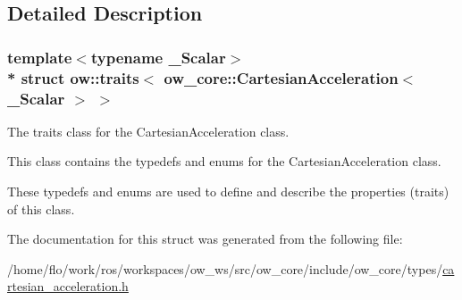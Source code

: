\subsection{Detailed Description}
\subsubsection*{template$<$typename \+\_\+\+Scalar$>$\\*
struct ow\+::traits$<$ ow\+\_\+core\+::\+Cartesian\+Acceleration$<$ \+\_\+\+Scalar $>$ $>$}

The traits class for the Cartesian\+Acceleration class. 

This class contains the typedefs and enums for the Cartesian\+Acceleration class.

These typedefs and enums are used to define and describe the properties (traits) of this class. 

The documentation for this struct was generated from the following file\+:\begin{DoxyCompactItemize}
\item 
/home/flo/work/ros/workspaces/ow\+\_\+ws/src/ow\+\_\+core/include/ow\+\_\+core/types/\hyperlink{cartesian__acceleration_8h}{cartesian\+\_\+acceleration.\+h}\end{DoxyCompactItemize}
